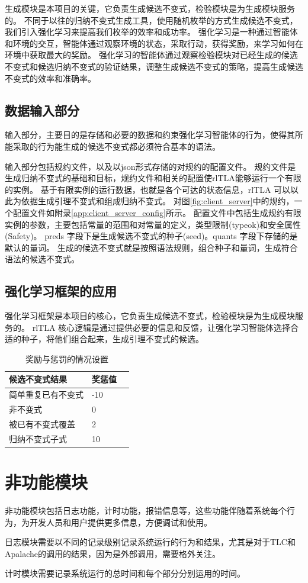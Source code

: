 生成模块是本项目的关键，它负责生成候选不变式，检验模块是为生成模块服务的。
不同于以往的归纳不变式生成工具，使用随机枚举的方式生成候选不变式，我们引入强化学习来提高我们枚举的效率和成功率。
强化学习是一种通过智能体和环境的交互，智能体通过观察环境的状态，采取行动，获得奖励，来学习如何在环境中获取最大的奖励。
强化学习的智能体通过观察检验模块对已经生成的候选不变式和候选归纳不变式的验证结果，调整生成候选不变式的策略，提高生成候选不变式的效率和准确率。

\subsection{数据输入部分}

输入部分，主要目的是存储和必要的数据和约束强化学习智能体的行为，使得其所能采取的行为能生成的候选不变式都必须符合基本的语法。

输入部分包括\TLA 规约文件，以及以json形式存储的对规约的配置文件。
\TLA 规约文件是生成归纳不变式的基础和目标，规约文件和相关的配置使rlTLA能够运行一个有限的实例。
基于有限实例的运行数据，也就是各个可达的状态信息，rlTLA 可以以此为依据生成引理不变式和组成归纳不变式。
对图\ref{fig:client_server}中的规约，一个配置文件如附录\ref{app:client_server_config}所示。
配置文件中包括生成规约有限实例的参数，主要包括常量的范围和对常量的定义，类型限制(typeok)和安全属性(Safety)。
preds 字段下是生成候选不变式的种子(seed)。quants 字段下存储的是默认的量词。
生成的候选不变式就是按照语法规则，组合种子和量词，生成符合语法的候选不变式。

\subsection{强化学习框架的应用}

强化学习框架是本项目的核心，它负责生成候选不变式，检验模块是为生成模块服务的。
rlTLA 核心逻辑是通过提供必要的信息和反馈，让强化学习智能体选择合适的种子，将他们组合起来，生成引理不变式的候选。



\begin{table}[!h]
    \label{table:award_punish}
	\centering
	\caption{奖励与惩罚的情况设置}
	\label{tab::situation}
	\renewcommand\arraystretch{1.4}
	\begin{tabular}{p{}p{}p{}}
		\toprule
		\textbf{候选不变式结果}   & \textbf{奖惩值} \\ 
        \midrule
		简单重复已有不变式 & -10 \\
		非不变式      & 0   \\
		被已有不变式覆盖  & 2   \\
		归纳不变式子式   & 10 \\
        \bottomrule
	\end{tabular}
\end{table}


\section{非功能模块}

非功能模块包括日志功能，计时功能，报错信息等，这些功能伴随着系统每个行为，为开发人员和用户提供更多信息，方便调试和使用。

日志模块需要以不同的记录级别记录系统运行的行为和结果，尤其是对于TLC和Apalache的调用的结果，因为是外部调用，需要格外关注。

计时模块需要记录系统运行的总时间和每个部分分别运用的时间。
